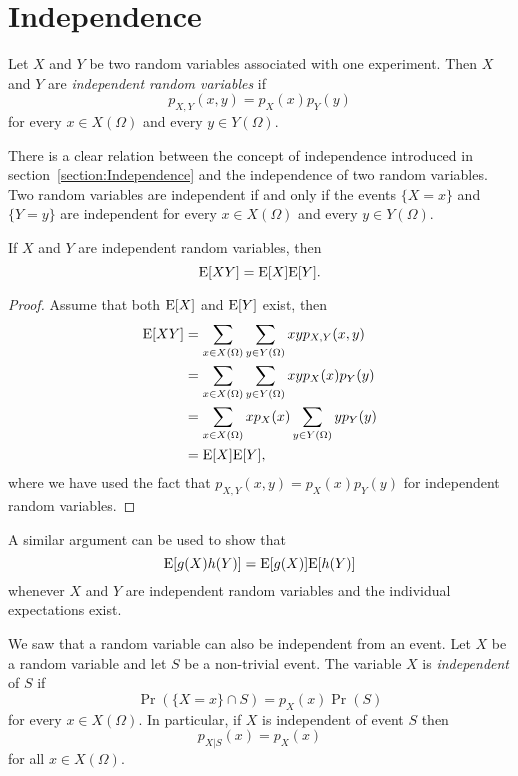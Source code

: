 \section{Independence}

Let $X$ and $Y$ be two random variables associated with one experiment.
Then $X$ and $Y$ are \emph{independent random variables} if
\begin{equation*}
p_{X,Y} (x,y) = p_X (x) p_Y (y)
\end{equation*}
for every $x \in X(\Omega)$ and every $y \in Y(\Omega)$.

There is a clear relation between the concept of independence introduced in section~\ref{section:Independence} and the independence of two random variables.
Two random variables are independent if and only if the events $\{ X = x \}$ and $\{ Y = y \}$ are independent for every $x \in X(\Omega)$ and every $y \in Y(\Omega)$.

\begin{theorem}
If $X$ and $Y$ are independent random variables, then
\begin{equation*}
\mathrm{E} [X Y] = \mathrm{E} [X] \mathrm{E} [Y] .
\end{equation*}
\end{theorem}
\begin{proof}
Assume that both $\mathrm{E} [X]$ and $\mathrm{E}[Y]$ exist, then
\begin{equation*}
\begin{split}
\mathrm{E} [XY]
&= \sum_{x \in X(\Omega)} \sum_{y \in Y(\Omega)} x y p_{X,Y} (x,y) \\
&= \sum_{x \in X(\Omega)} \sum_{y \in Y(\Omega)} x y p_X (x) p_Y (y) \\
&= \sum_{x \in X(\Omega)} x p_X (x) \sum_{y \in Y(\Omega)} y p_Y (y) \\
&= \mathrm{E} [X] \mathrm{E} [Y] ,
\end{split}
\end{equation*}
where we have used the fact that $p_{X,Y} (x,y) = p_X (x) p_Y (y)$ for independent random variables.
\end{proof}


A similar argument can be used to show that
\begin{equation*}
\mathrm{E}[ g(X) h(Y) ] = \mathrm{E} [ g(X) ] \mathrm{E} [ h(Y) ]
\end{equation*}
whenever $X$ and $Y$ are independent random variables and the individual expectations exist.

We saw that a random variable can also be independent from an event.
Let $X$ be a random variable and let $S$ be a non-trivial event.
The variable $X$ is \emph{independent} of $S$ if
\begin{equation*}
\Pr (\{X = x \} \cap S ) = p_X (x) \Pr (S)
\end{equation*}
for every $x \in X(\Omega)$.
In particular, if $X$ is independent of event $S$ then
\begin{equation*}
p_{X|S} (x) = p_X (x)
\end{equation*}
for all $x \in X(\Omega)$.

